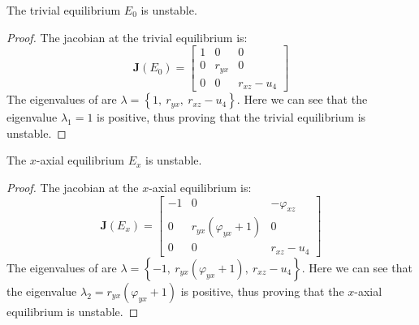 \begin{theorem}\label{thm:eq-trivial-stability}
    The trivial equilibrium $E_0$ is unstable.
\end{theorem}
\begin{proof}
    The jacobian at the trivial equilibrium is:
    \begin{equation}\label{matrix:jacobian-trivial}
        \textbf{J}\left(E_0\right) = \begin{bmatrix}
            1 & 0 & 0\\
            0 & r_{yx} & 0\\
            0 & 0 & r_{xz}-u_4
        \end{bmatrix}
    \end{equation}
    The eigenvalues of  are $\lambda=\left\{1,\ r_{yx},\ r_{xz}-u_4\right\}$. Here we can see that the eigenvalue $\lambda_1=1$ is positive, thus proving that the trivial equilibrium is unstable.
\end{proof}

\begin{theorem}\label{thm:eq-axial-x-stability}
    The $x$-axial equilibrium $E_x$ is unstable.
\end{theorem}
\begin{proof}
    The jacobian at the $x$-axial equilibrium is:
    \begin{equation}\label{matrix:jacobian-axial-x}
        \textbf{J}\left(E_x\right) = \begin{bmatrix}
            -1 & 0 & -\varphi_{xz}\\
            0 & r_{yx}\left(\varphi_{yx}+1\right) & 0\\
            0 & 0 & r_{xz}-u_4
        \end{bmatrix}
    \end{equation}
    The eigenvalues of  are $\lambda=\left\{-1,\ r_{yx}\left(\varphi_{yx}+1\right),\ r_{xz}-u_4\right\}$. Here we can see that the eigenvalue $\lambda_2=r_{yx}\left(\varphi_{yx}+1\right)$ is positive, thus proving that the $x$-axial equilibrium is unstable.
\end{proof}

